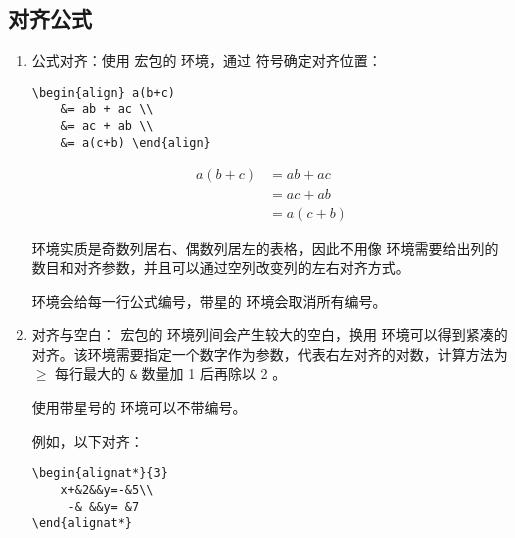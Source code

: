 \subsection{对齐公式}

\begin{enumerate}

\item 公式对齐：使用  宏包的  环境，通过 \boxforcmd{&} 符号确定对齐位置：

\begin{tcolorbox}[sidebyside]
\begin{lstlisting}
\begin{align} a(b+c) 
    &= ab + ac \\
    &= ac + ab \\ 
    &= a(c+b) \end{align}
\end{lstlisting} 

\tcblower

\begin{align} a(b+c) &= ab + ac \\
    &= ac + ab \\ &= a(c+b) \end{align}
\end{tcolorbox}

 环境实质是奇数列居右、偶数列居左的表格，因此不用像  环境需要给出列的数目和对齐参数，并且可以通过空列改变列的左右对齐方式。

 环境会给每一行公式编号，带星的  环境会取消所有编号。

\item 对齐与空白： 宏包的  环境列间会产生较大的空白，换用  环境可以得到紧凑的对齐。该环境需要指定一个数字作为参数，代表右左对齐的对数，计算方法为 $\geq$ 每行最大的 \verb|&| 数量加 1 后再除以 2 。

使用带星号的  环境可以不带编号。

例如，以下对齐：

\begin{tcolorbox}[sidebyside]
\begin{lstlisting}
\begin{alignat*}{3}
    x+&2&&y=-&5\\
     -& &&y= &7
\end{alignat*}
\end{lstlisting} 

\tcblower


\end{tcolorbox}
\end{enumerate}
